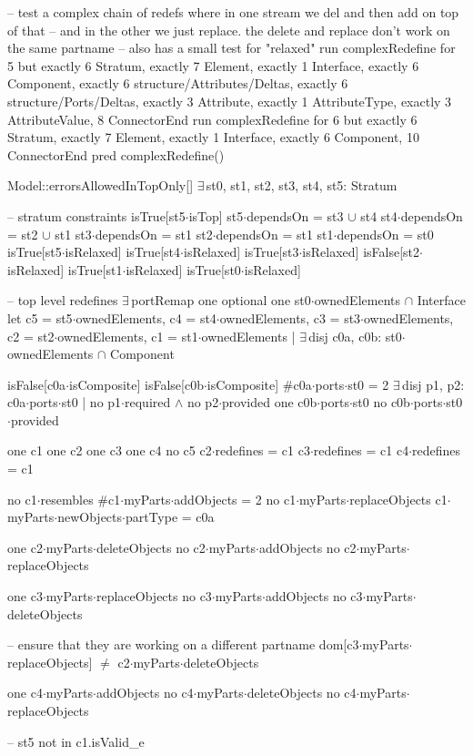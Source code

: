 -- test a complex chain of redefs where in one stream we del and then add on top of that
-- and in the other we just replace.  the delete and replace don't work on the same partname
-- also has a small test for "relaxed"
run complexRedefine for 5 but exactly 6 Stratum, exactly 7 Element, exactly 1 Interface, exactly 6 Component, exactly 6 structure/Attributes/Deltas, exactly 6 structure/Ports/Deltas, exactly 3 Attribute, exactly 1 AttributeType, exactly 3 AttributeValue, 8 ConnectorEnd
run complexRedefine for 6 but exactly 6 Stratum, exactly 7 Element, exactly 1 Interface, exactly 6 Component, 10 ConnectorEnd
pred complexRedefine()
{
  Model::errorsAllowedInTopOnly[]
  $\exists\,$st0, st1, st2, st3, st4, st5: Stratum
  {
    -- stratum constraints
    isTrue[st5$\cdot$isTop]
    st5$\cdot$dependsOn = st3 $\cup$ st4
    st4$\cdot$dependsOn = st2 $\cup$ st1
    st3$\cdot$dependsOn = st1
    st2$\cdot$dependsOn = st1
    st1$\cdot$dependsOn = st0
    isTrue[st5$\cdot$isRelaxed]
    isTrue[st4$\cdot$isRelaxed]
    isTrue[st3$\cdot$isRelaxed]
    isFalse[st2$\cdot$isRelaxed]
    isTrue[st1$\cdot$isRelaxed]
    isTrue[st0$\cdot$isRelaxed]

    -- top level redefines
    $\exists\,$portRemap
    one optional
    one st0$\cdot$ownedElements $\cap$ Interface
    let
      c5 = st5$\cdot$ownedElements,
      c4 = st4$\cdot$ownedElements,
      c3 = st3$\cdot$ownedElements,
      c2 = st2$\cdot$ownedElements,
      c1 = st1$\cdot$ownedElements |
    $\exists\,$disj c0a, c0b: st0$\cdot$ownedElements $\cap$ Component
    {
      isFalse[c0a$\cdot$isComposite]
      isFalse[c0b$\cdot$isComposite]
      #c0a$\cdot$ports$\cdot$st0 = 2
      $\exists\,$disj p1, p2: c0a$\cdot$ports$\cdot$st0 |
        no p1$\cdot$required $\wedge$ no p2$\cdot$provided
      one c0b$\cdot$ports$\cdot$st0
      no c0b$\cdot$ports$\cdot$st0$\cdot$provided
      
      one c1 one c2 one c3 one c4 no c5
      c2$\cdot$redefines = c1
      c3$\cdot$redefines  = c1
      c4$\cdot$redefines = c1
  
      no c1$\cdot$resembles
      #c1$\cdot$myParts$\cdot$addObjects = 2
      no c1$\cdot$myParts$\cdot$replaceObjects
      c1$\cdot$myParts$\cdot$newObjects$\cdot$partType = c0a
      
      one c2$\cdot$myParts$\cdot$deleteObjects
      no c2$\cdot$myParts$\cdot$addObjects
      no c2$\cdot$myParts$\cdot$replaceObjects
      
      one c3$\cdot$myParts$\cdot$replaceObjects
      no c3$\cdot$myParts$\cdot$addObjects
      no c3$\cdot$myParts$\cdot$deleteObjects
      
      -- ensure that they are working on a different partname
      dom[c3$\cdot$myParts$\cdot$replaceObjects] $\neq$ c2$\cdot$myParts$\cdot$deleteObjects
      
      one c4$\cdot$myParts$\cdot$addObjects
      no c4$\cdot$myParts$\cdot$deleteObjects
      no c4$\cdot$myParts$\cdot$replaceObjects
      
--      st5 not in c1.isValid_e
    }
  }
}

